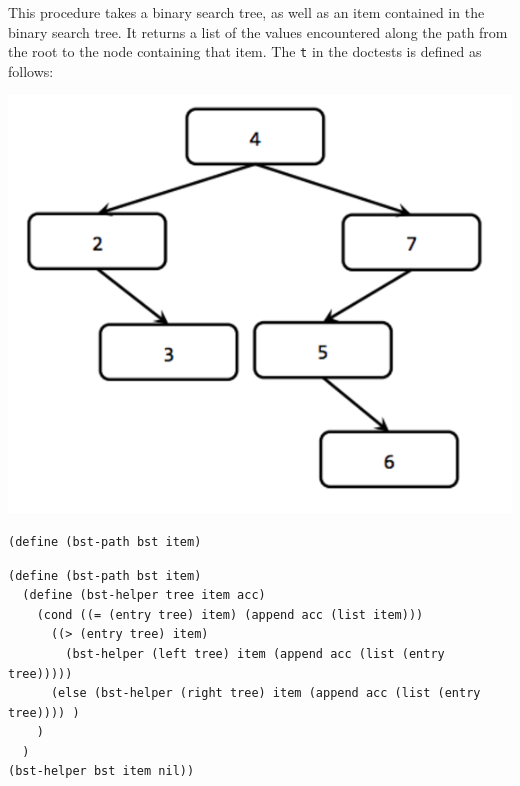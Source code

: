 \documentclass{exam}
\begin{document}
\begin{questions}
This procedure takes a binary search tree, as well as an item contained in the binary search tree. It returns a list of the values encountered along the path from the root to the node containing that item. The \texttt{t} in the doctests is defined as follows:
\begin{center}
 \includegraphics[scale=0.7]{bstPath}
\end{center}


\clearpage

\begin{lstlisting}[language=Scheme]
(define (bst-path bst item)
\end{lstlisting}

\begin{solution}[6cm]
\begin{lstlisting}
(define (bst-path bst item) 
  (define (bst-helper tree item acc)
    (cond ((= (entry tree) item) (append acc (list item)))
      ((> (entry tree) item) 
        (bst-helper (left tree) item (append acc (list (entry tree))))) 
      (else (bst-helper (right tree) item (append acc (list (entry tree)))) )
    )
  ) 
(bst-helper bst item nil))
\end{lstlisting}
\end{solution}
\end{questions}

\end{document}
